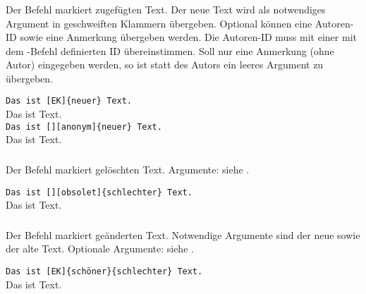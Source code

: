 \subsubsection{}
\DescribeMacro{\added}

Der Befehl  markiert zugefügten Text.
Der neue Text wird als notwendiges Argument in geschweiften Klammern übergeben.
Optional können eine Autoren-ID sowie eine Anmerkung übergeben werden.
Die Autoren-ID muss mit einer mit dem -Befehl definierten ID übereinstimmen.
Soll nur eine Anmerkung (ohne Autor) eingegeben werden, so ist statt des Autors ein leeres Argument zu übergeben.
\begin{einspiel}
\>
\end{einspiel}
\begin{einspiel}[true]
\>\texttt{Das ist [EK]\{neuer\} Text.}\\
\>Das ist  Text.\\
\>\texttt{Das ist [][anonym]\{neuer\} Text.}\\
\>Das ist  Text.
\end{einspiel}

\subsubsection{}
\DescribeMacro{\deleted}

Der Befehl  markiert gelöschten Text.
Argumente: siehe .
\begin{einspiel}
\>
\end{einspiel}
\begin{einspiel}[true]
\>\texttt{Das ist [][obsolet]\{schlechter\} Text.}\\
\>Das ist  Text.
\end{einspiel}

\subsubsection{}
\DescribeMacro{\replaced}

Der Befehl  markiert geänderten Text.
Notwendige Argumente sind der neue sowie der alte Text.
Optionale Argumente: siehe .
\begin{einspiel}
\>
\end{einspiel}
\begin{einspiel}[true]
\>\texttt{Das ist [EK]\{schöner\}\{schlechter\} Text.}\\
\>Das ist  Text.
\end{einspiel}

